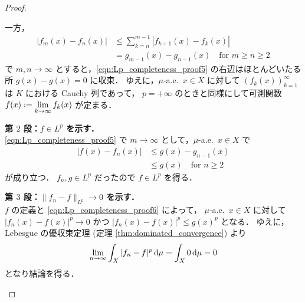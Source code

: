 \begin{proof}
\begin{itemize}[leftmargin=\parindent]
        一方，
        \begin{align}
            |f_m(x)-f_n(x)|
            &\le\sum_{k=n}^{m-1}|f_{k+1}(x)-f_k(x)|\nonumber\\
            &=g_{m-1}(x)-g_{n-1}(x)\quad\text{for $m\ge n\ge2$}\label{eqn:Lp_completeness_proof5}
        \end{align}
        で $m,n\to\infty$ とすると，\eqref{eqn:Lp_completeness_proof5} の右辺はほとんどいたる所 $g(x)-g(x)=0$ に収束．
        ゆえに，$\mu$-a.e.\ $x\in X$ に対して $(f_k(x))_{k=1}^\infty$ は $K$ における Cauchy 列であって，
        $p=+\infty$ のときと同様にして可測関数 $\displaystyle f(x)\defeq\lim_{k\to\infty}f_k(x)$ が定まる．

        \textbf{第 $2$ 段：$f\in L^p$ を示す．}\\
        \eqref{eqn:Lp_completeness_proof5} で $m\to\infty$ として，$\mu$-a.e.\ $x\in X$ で
        \begin{align}
            |f(x)-f_n(x)|
            &\le g(x)-g_{n-1}(x)\nonumber\\
            &\le g(x)\quad\text{for $n\ge2$}\label{eqn:Lp_completeness_proof6}
        \end{align}
        が成り立つ．
        $f_n,g\in L^p$ だったので $f\in L^p$ を得る．

        \textbf{第 $3$ 段：$\|f_n-f\|_{L^p}\to0$ を示す．}\\
        $f$ の定義と \eqref{eqn:Lp_completeness_proof6} によって，
        $\mu$-a.e.\ $x\in X$ に対して $|f_n(x)-f(x)|^p\to0$ かつ $|f_n(x)-f(x)|^p\le g(x)^p$ となる．
        ゆえに，Lebesgue の優収束定理 (定理 \ref{thm:dominated_convergence}) より
        \begin{align*}
            \lim_{n\to\infty}\int_X|f_n-f|^p\,\mathrm{d}\mu
            =\int_X0\,\mathrm{d}\mu=0
        \end{align*}
        となり結論を得る．
    \end{itemize}
\end{proof}

